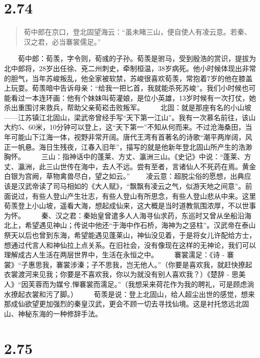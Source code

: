 \documentclass[]{book}
\begin{document}
\section{2.74}\label{section-120}

\begin{quote}
荀中郎在京口，登北固望海云：``虽未睹三山，便自使人有凌云意。若秦、汉之君，必当褰裳儒足。''
\end{quote}

　　荀中郎：荀羡，字令则，荀彧的子孙。荀羡是驸马，受到殷浩的赏识，提拔为北中郎将，28岁出任徐、兗二州刺史，牵制桓温，38岁病死。他小时候体现出非常的胆气，当年苏峻叛乱，他全家被软禁，苏峻很喜欢荀羡，常抱着7岁的他在膝盖上玩耍。荀羡暗中告诉母亲：``给我一把匕首，我就能杀死苏峻''。我们小时候也可能看过一本连环画：他有个妹妹叫荀灌娘，是位小英雄，13岁时候有一次打仗，她杀出重围讨来救兵，帮助父亲荀崧击败叛军。
　　北固：就是那座有名的小山坡------江苏镇江北固山，梁武帝曾经手写``天下第一江山''。我有一次慕名前往，该山大约5、60米，10分钟可以登上，这``天下第一''不知从何而来。不过沧海桑田，当年可能山下江海一体，视野非常开阔。唐代王湾有首著名的诗歌``潮平两岸阔，风正一帆悬。海日生残夜，江春入旧年''，描写的就是他新年登北固山所产生的浩渺胸怀。
　　三山：指神话中的蓬莱、方丈、瀛洲三山。《史记》中说：``蓬莱、方丈、瀛洲，此三山世传在海中，去人不远。尝有至者，言诸仙人不死药在焉。黄金白银为宫阙，草物禽兽尽白，望之如云。''
　　凌云意：超脱尘俗的愿想，出典应该是汉武帝读了司马相如的《大人赋》，``飘飘有凌云之气，似游天地之间意''。前面说过，有些人登山产生壮志，有些人登山有所思念，有些人登山悲从中来。这里荀羡登上小山坡，遥看大海，想起成仙来，这大概是当时道教氛围浓厚，不以世事为怀。
　　秦、汉之君：秦始皇曾遣多人人海寻仙求药，东巡时又曾从坐船沿海北上，希望遇见神山；传说中他还``于海中作石桥，海神为之竖柱''。汉武帝在泰山祭天以后也曾到东海，希望能遇见蓬莱山，神仙没见着，于是将女儿许配给方士，想通过代言人和神仙拉上点关系。在旧社会，没有像现在这样的无神论，我们可以理解成古人生活在两层世界中，生活在永恒之中。
　　褰裳濡足：《诗 -
褰裳》``子惠思我，褰裳涉溱；子不思我，岂无他人。''（你要是喜欢我，就赶快撩起衣裳渡河来见我；你要是不喜欢我，你以为就没有别人喜欢我？）《楚辞
-
思美人》``因芙蓉而为媒兮,惮褰裳而濡足。''（我想采来荷花作为我的聘礼，可是顾虑淌水撩起衣裳和污了脚。）
　　荀羡是说：登上北固山，给人超尘出世的感觉，想来那成仙欲望更加强烈的秦皇汉武，更会不顾一切去寻找仙境。这是衬托悠远北固山、神秘东海的一种修辞手法。

\section{2.75}\label{section-121}
\end{document}
